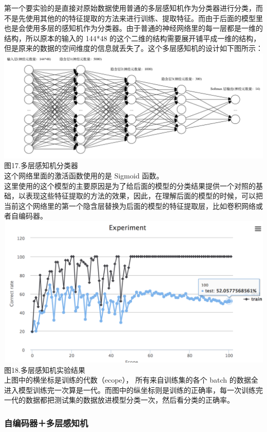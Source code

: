 第一个要实验的是直接对原始数据使用普通的多层感知机作为分类器进行分类，而不是先使用其他的的特征提取的方法来进行训练、提取特征。而由于后面的模型里也是会使用多层的感知机作为分类器。由于普通的神经网络里的每一层都是一维的结构，所以原本的输入的
144*48
的这个二维的结构需要展开铺平成一维的结构，但是原来的数据的空间维度的信息就丢失了。这个多层感知机的设计如下图所示：\\\includegraphics{picture/5l-mlp.png}\\图17.多层感知机分类器\\这个网络里面的激活函数使用的是
Sigmoid
函数。\\这里使用的这个模型的主要原因是为了给后面的模型的分类结果提供一个对照的基础，以表现这些特征提取的方法的效果，因此，在理解后面的模型的时候，可以把当前这个网络里的第一个隐含层替换为后面的模型的特征提取层，比如卷积网络或者自编码器。\\\includegraphics{picture/5l-mlp-experiment.png}\\图18.多层感知机实验结果\\上图中的横坐标是训练的代数（ecope），
所有来自训练集的各个 batch
的数据全进入模型训练完一次算是一代。而图中的纵坐标则是训练的正确率，每一次训练完一代的数据都把测试集的数据放进模型分类一次，然后看分类的正确率。

\subsubsection{自编码器＋多层感知机}\label{ux81eaux7f16ux7801ux5668ux591aux5c42ux611fux77e5ux673a}

